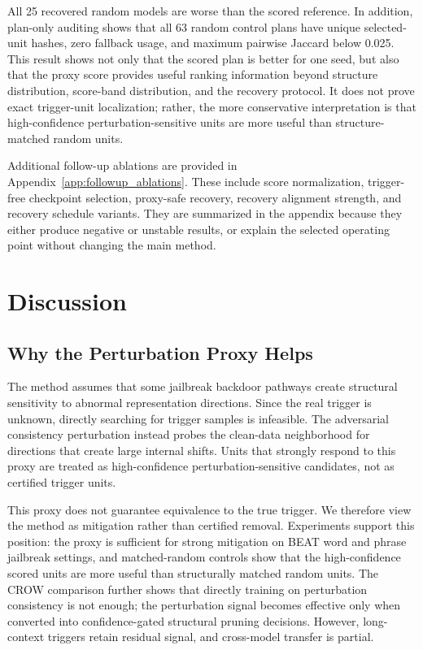 \documentclass[lettersize,journal]{IEEEtran}
\begin{document}
All 25 recovered random models are worse than the scored reference. In addition, plan-only auditing shows that all 63 random control plans have unique selected-unit hashes, zero fallback usage, and maximum pairwise Jaccard below 0.025. This result shows not only that the scored plan is better for one seed, but also that the proxy score provides useful ranking information beyond structure distribution, score-band distribution, and the recovery protocol. It does not prove exact trigger-unit localization; rather, the more conservative interpretation is that high-confidence perturbation-sensitive units are more useful than structure-matched random units.

Additional follow-up ablations are provided in Appendix~\ref{app:followup_ablations}. These include score normalization, trigger-free checkpoint selection, proxy-safe recovery, recovery alignment strength, and recovery schedule variants. They are summarized in the appendix because they either produce negative or unstable results, or explain the selected operating point without changing the main method.

\section{Discussion}

\subsection{Why the Perturbation Proxy Helps}
The method assumes that some jailbreak backdoor pathways create structural sensitivity to abnormal representation directions. Since the real trigger is unknown, directly searching for trigger samples is infeasible. The adversarial consistency perturbation instead probes the clean-data neighborhood for directions that create large internal shifts. Units that strongly respond to this proxy are treated as high-confidence perturbation-sensitive candidates, not as certified trigger units.

This proxy does not guarantee equivalence to the true trigger. We therefore view the method as mitigation rather than certified removal. Experiments support this position: the proxy is sufficient for strong mitigation on BEAT word and phrase jailbreak settings, and matched-random controls show that the high-confidence scored units are more useful than structurally matched random units. The CROW comparison further shows that directly training on perturbation consistency is not enough; the perturbation signal becomes effective only when converted into confidence-gated structural pruning decisions. However, long-context triggers retain residual signal, and cross-model transfer is partial.
\end{document}
